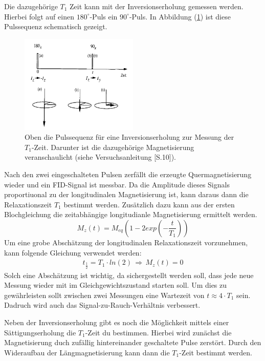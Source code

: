 Die dazugeh\"{o}rige $T_1$ Zeit kann mit der Inversionserholung gemessen werden.
Hierbei folgt auf einen $180^{\circ}$-Puls ein $90^{\circ}$-Puls.
In Abbildung (\ref{inversion}) ist diese Pulssequenz schematisch gezeigt.
\begin{figure}
	\centering
	\includegraphics[width=0.5\textwidth]{Plots/inversionserholung.png}
	\caption{Oben die Pulssequenz f\"{u}r eine Inversionserholung zur Messung der $T_1$-Zeit. Darunter ist die dazugeh\"{o}rige Magnetisierung veranschaulicht (siehe Versuchsanleitung \cite{Anleitung}[S.10]).}
	\label{inversion}
\end{figure}
Nach den zwei eingeschalteten Pulsen zerf\"{a}llt die erzeugte Quer{\-}mag{\-}ne{\-}ti{\-}sie{\-}rung wieder und ein FID-Signal ist messbar.
Da die Amplitude dieses Signals proportiuonal zu der longitudinalen Magnetisierung ist, kann daraus dann die Relaxationszeit $T_1$ bestimmt werden.
Zus\"{a}tzlich dazu kann aus der ersten Blochgleichung die zeitabh\"{a}ngige longitudianle Magnetisierung ermittelt werden.
\begin{equation*}
	M_z(t) = M_{eq} \left(1 - 2 exp\left( - \frac{t}{T_1} \right) \right)
	\label{eq:Mz}
\end{equation*}
Um eine grobe Absch\"{a}tzung der longitudinalen Relaxationszeit vorzunehmen, kann folgende Gleichung verwendet werden:
\begin{align*}
	t_{\frac{1}{2}} = T_1 \cdot ln(2) \, \Rightarrow \, M_z(t) = 0
\end{align*}
Solch eine Absch\"{a}tzung ist wichtig, da sichergestellt werden soll, dass jede neue Messung wieder mit im Gleichgewichtszustand starten soll.
Um dies zu gew\"{a}hrleisten sollt zwischen zwei Messungen eine Wartezeit von $t \approx 4 \cdot T_1$ sein.
Dadruch wird auch das Signal-zu-Rauch-Verh\"{a}ltnis verbessert.

Neben der Inversionserholung gibt es noch die M\"{o}glichkeit mittels einer S\"{a}ttigungs{\-}erhol{\-}ung die $T_1$-Zeit du bestimmen.
Hierbei wird zun\"{a}chst die Magnetisierung duch zuf\"{a}llig hintereinander geschaltete Pulse zerst\"{o}rt.
Durch den Wideraufbau der L\"{a}ngmagnetisierung kann dann die $T_1$-Zeit bestimmt werden.

